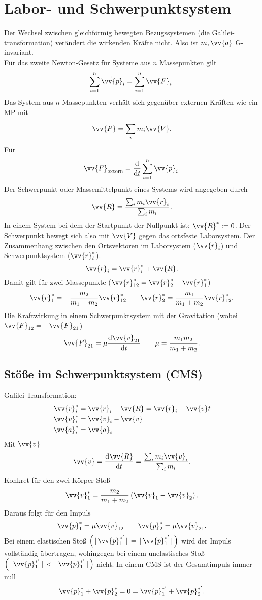 \documentclass[a4paper,12pt]{article}
\begin{document}
\section{Labor- und Schwerpunktsystem}
Der Wechsel zwischen gleichförmig bewegten Bezugssystemen (die Galilei-transformation) verändert die wirkenden Kräfte nicht. Also ist $m,\vv{a}$ G-invariant.\\
Für das zweite Newton-Gesetz für Systeme aus $n$ Massepunkten gilt 
\[ 
        \sum_{i=1}^{n}\dot{\vv{p}}_i=\sum_{i=1}^{n}\vv{F}_i
.\] 
Das System aus $n$ Massepunkten verhält sich gegenüber externen Kräften wie ein MP mit
\[ 
        \vv{P}=\sum_{i}^{}m_i\vv{V}
.\] 
Für 
\[ 
        \vv{F}_{\text{extern}}=\dfrac{\text{d}}{\text{d}t}\sum_{i=1}^{n}\vv{p}_i
.\] 
Der Schwerpunkt oder Massemittelpunkt eines Systems wird angegeben durch
\[ 
        \vv{R}=\dfrac{\sum_{i}^{}m_i\vv{r}_i}{\sum_{i}^{}m_i}
.\] 
In einem System bei dem der Startpunkt der Nullpunkt ist: $\vv{R}^{*}:=0$. Der Schwerpunkt bewegt sich also mit $\vv{V}$ gegen das ortsfeste Laborsystem. Der Zusammenhang zwischen den Ortsvektoren im Laborsystem ($\vv{r}_i$) und Schwerpunktsystem ($\vv{r}^{*}_i$).
\[ 
        \vv{r}_i=\vv{r}^{*}_i+\vv{R}
.\] 
Damit gilt für zwei Massepunkte ($\vv{r}_{12}^{*}=\vv{r}_2^{*}-\vv{r}_1^{*}$)
\[ 
        \vv{r}_1^{*}=-\dfrac{m_2}{m_1+m_2}\vv{r}^{*}_{12}\qquad \vv{r}_2^{*}=\dfrac{m_1}{m_1+m_2}\vv{r}_{12}^{*}
.\] 
Die Kraftwirkung in einem Schwerpunktsystem mit der Gravitation (wobei $\vv{F}_{12}=-\vv{F}_{21}$)
\[ 
        \vv{F}_{21}=\mu \dfrac{\text{d}\vv{v}_{21}}{\text{d}t}\qquad \mu =\dfrac{m_1m_2}{m_1+m_2}
.\] 

\subsection{Stöße im Schwerpunktsystem (CMS)}
Galilei-Transformation:
\begin{align*}
        \vv{r}_i^{*}&=\vv{r}_i-\vv{R}=\vv{r}_i-\vv{v}t\\
        \vv{v}_i^{*}&=\vv{v}_i-\vv{v}\\
        \vv{a}_i^{*}&=\vv{a}_i
\end{align*}
Mit $\vv{v}$ 
\[ 
        \vv{v}=\dfrac{\text{d}\vv{R}}{\text{d}t}=\dfrac{\sum_{i}^{}m_i\vv{v}_i}{\sum_{i}^{}m_i}
.\]
Konkret für den zwei-Körper-Stoß
\[ 
        \vv{v}_1^{*}=\dfrac{m_2}{m_1+m_2}\left(\vv{v}_1-\vv{v}_2\right)
.\] 
Daraus folgt für den Impuls
\[ 
        \vv{p}_1^{*}=\mu \vv{v}_{12}\qquad \vv{p}_2^{*}=\mu \vv{v}_{21}
.\] 
Bei einem elastischen Stoß $\left(\,|\, \vv{p}_1^{*'}\,|\, =\,|\, \vv{p}_1^{*'}\,|\, \right)$ wird der Impuls vollständig übertragen, wohingegen bei einem unelastisches Stoß $\left(\,|\, \vv{p}_1^{*'}\,|\, <\,|\, \vv{p}_1^{*'}\,|\, \right)$ nicht. In einem CMS ist der Gesamtimpuls immer null
\[ 
        \vv{p}_1^{*}+\vv{p}_2^{*}=0=\vv{p}_1^{*'}+\vv{p}_2^{*'}
.\] 
\end{document}
